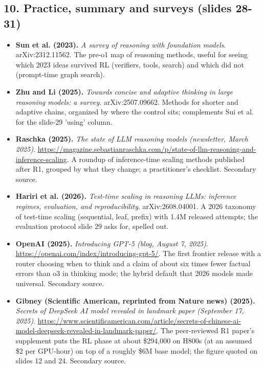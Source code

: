 \subsection*{10. Practice, summary and surveys (slides 28-31)}
\begin{itemize}[leftmargin=1.2em,itemsep=3pt]\sloppy
\item \textbf{Sun et al. (2023).} \textit{A survey of reasoning with foundation models}. arXiv:2312.11562. The pre-o1 map of reasoning methods, useful for seeing which 2023 ideas survived RL (verifiers, tools, search) and which did not (prompt-time graph search).
\item \textbf{Zhu and Li (2025).} \textit{Towards concise and adaptive thinking in large reasoning models: a survey}. arXiv:2507.09662. Methods for shorter and adaptive chains, organized by where the control sits; complements Sui et al. for the slide-29 'using' column.
\item \textbf{Raschka (2025).} \textit{The state of LLM reasoning models (newsletter, March 2025)}. \url{https://magazine.sebastianraschka.com/p/state-of-llm-reasoning-and-inference-scaling}. A roundup of inference-time scaling methods published after R1, grouped by what they change; a practitioner's checklist. Secondary source.
\item \textbf{Hariri et al. (2026).} \textit{Test-time scaling in reasoning LLMs: inference regimes, evaluation, and reproducibility}. arXiv:2608.04001. A 2026 taxonomy of test-time scaling (sequential, leaf, prefix) with 1.4M released attempts; the evaluation protocol slide 29 asks for, spelled out.
\item \textbf{OpenAI (2025).} \textit{Introducing GPT-5 (blog, August 7, 2025)}. \url{https://openai.com/index/introducing-gpt-5/}. The first frontier release with a router choosing when to think and a claim of about six times fewer factual errors than o3 in thinking mode; the hybrid default that 2026 models made universal. Secondary source.
\item \textbf{Gibney (Scientific American, reprinted from Nature news) (2025).} \textit{Secrets of DeepSeek AI model revealed in landmark paper (September 17, 2025)}. \url{https://www.scientificamerican.com/article/secrets-of-chinese-ai-model-deepseek-revealed-in-landmark-paper/}. The peer-reviewed R1 paper's supplement puts the RL phase at about \$294,000 on H800s (at an assumed \$2 per GPU-hour) on top of a roughly \$6M base model; the figure quoted on slides 12 and 24. Secondary source.
\end{itemize}

